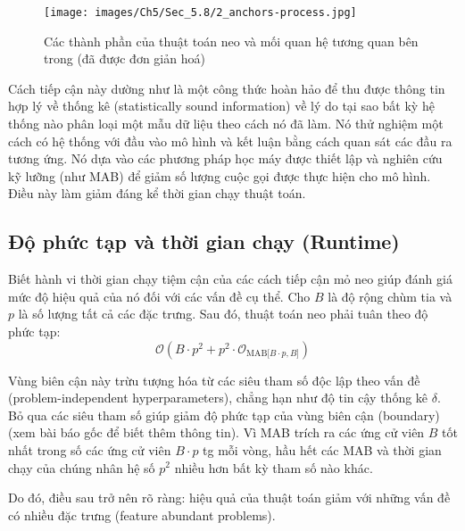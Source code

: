 \begin{figure*}[h!]
	\centering
	\texttt{[image: images/Ch5/Sec\_5.8/2\_anchors-process.jpg]}
	\label{fig:5_38}
	\caption{Các thành phần của thuật toán neo và mối quan hệ tương quan bên trong (đã được đơn giản hoá)}
\end{figure*}


Cách tiếp cận này dường như là một công thức hoàn hảo để thu được thông tin hợp lý về thống kê (statistically sound information) về lý do tại sao bất kỳ hệ thống nào phân loại một mẫu dữ liệu theo cách nó đã làm. Nó thử nghiệm một cách có hệ thống với đầu vào mô hình và kết luận bằng cách quan sát các đầu ra tương ứng. Nó dựa vào các phương pháp học máy được thiết lập và nghiên cứu kỹ lưỡng (như MAB) để giảm số lượng cuộc gọi được thực hiện cho mô hình. Điều này làm giảm đáng kể thời gian chạy thuật toán.

\subsection{Độ phức tạp và thời gian chạy (Runtime)}
Biết hành vi thời gian chạy tiệm cận của các cách tiếp cận mỏ neo giúp đánh giá mức độ hiệu quả của nó đối với các vấn đề cụ thể. Cho $ B $ là độ rộng chùm tia và $ p $ là số lượng tất cả các đặc trưng. Sau đó, thuật toán neo phải tuân theo độ phức tạp:
$$\mathcal{O}(B\cdot{}p^2+p^2\cdot\mathcal{O}_{\textrm{MAB}\lbrack{}B\cdot{}p,B\rbrack})$$

Vùng biên cận này trừu tượng hóa từ các siêu tham số độc lập theo vấn đề (problem-independent hyperparameters), chẳng hạn như độ tin cậy thống kê $ \delta $. Bỏ qua các siêu tham số giúp giảm độ phức tạp của vùng biên cận (boundary) (xem bài báo gốc để biết thêm thông tin). Vì MAB trích ra các ứng cử viên $ B $ tốt nhất trong số các ứng cử viên $ B \cdot p $ tg mỗi vòng, hầu hết các MAB và thời gian chạy của chúng nhân hệ số $ p^2 $ nhiều hơn bất kỳ tham số nào khác.

Do đó, điều sau trở nên rõ ràng: hiệu quả của thuật toán giảm với những vấn đề có nhiều đặc trưng (feature abundant problems).
